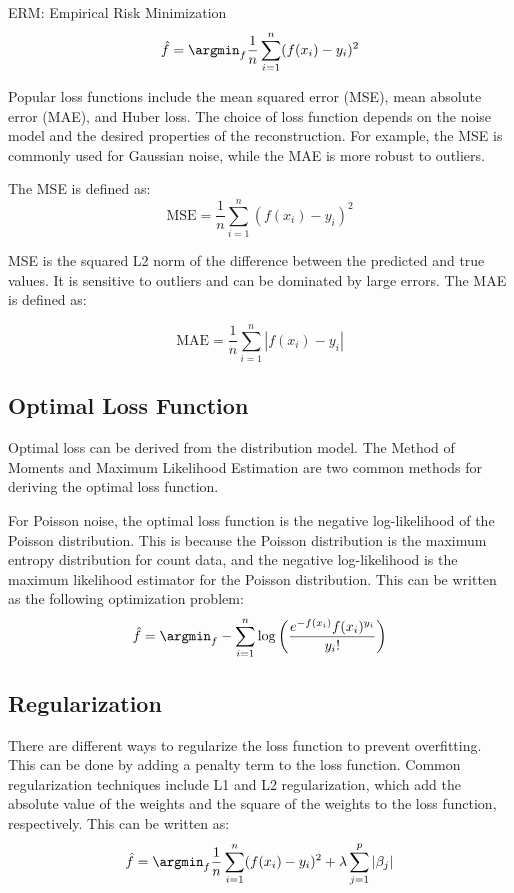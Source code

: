 ERM: Empirical Risk Minimization
\begin{equation}
    \hat{f} = \argmin_f \frac{1}{n} \sum_{i=1}^{n} (f(x_i) - y_i)^{2}
\end{equation}

Popular loss functions include the mean squared error (MSE), mean absolute error (MAE), and Huber loss. The choice of loss function depends on the noise model and the desired properties of the reconstruction. For example, the MSE is commonly used for Gaussian noise, while the MAE is more robust to outliers.

The MSE is defined as:
\begin{equation}
    \text{MSE} = \frac{1}{n} \sum_{i=1}^{n} (f(x_i) - y_i)^{2}
\end{equation}

MSE is the squared L2 norm of the difference between the predicted and true values. It is sensitive to outliers and can be dominated by large errors. The MAE is defined as:

\begin{equation}
    \text{MAE} = \frac{1}{n} \sum_{i=1}^{n} \left| f(x_i) - y_i \right|
\end{equation}

\subsection{Optimal Loss Function}
Optimal loss can be derived from the distribution model. The Method of Moments and Maximum Likelihood Estimation are two common methods for deriving the optimal loss function. 

For Poisson noise, the optimal loss function is the negative log-likelihood of the Poisson distribution. This is because the Poisson distribution is the maximum entropy distribution for count data, and the negative log-likelihood is the maximum likelihood estimator for the Poisson distribution.
This can be written as the following optimization problem:
\begin{equation}
    \hat{f} = \argmin_f -\sum_{i=1}^{n} \log \left( \frac{e^{-f(x_i)} f(x_i)^{y_i}}{y_i!} \right)
\end{equation}


\subsection{Regularization}
There are different ways to regularize the loss function to prevent overfitting. This can be done by adding a penalty term to the loss function. Common regularization techniques include L1 and L2 regularization, which add the absolute value of the weights and the square of the weights to the loss function, respectively. This can be written as:
\begin{equation}
    \hat{f} = \argmin_f \frac{1}{n} \sum_{i=1}^{n} (f(x_i) - y_i)^{2} + \lambda \sum_{j=1}^{p} \left| \beta_j \right|
\end{equation}

